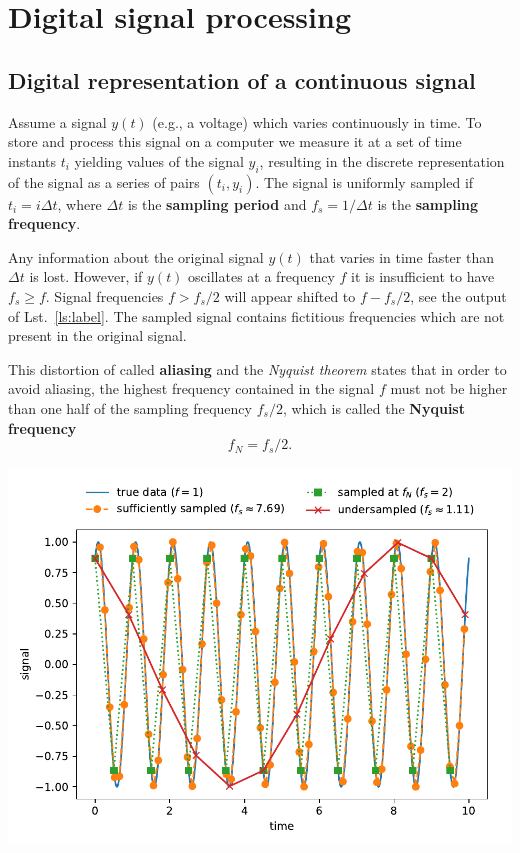 \documentclass{article}
\begin{document}
\newpage
\section{Digital signal processing}
\subsection{Digital representation of a continuous signal}
Assume a signal $y(t)$ (e.g., a voltage) which varies continuously in time. To store and process this signal on a computer we measure it at a set of time instants $t_i$ yielding values of the signal $y_i$, resulting in the discrete representation of the signal as a series of pairs $(t_i, y_i)$. The signal is uniformly sampled if $t_i = i\Delta t$, where $\Delta t$ is the \textbf{sampling period} and $f_s = 1/\Delta t$ is the \textbf{sampling frequency}.

Any information about the original signal $y(t)$ that varies in time faster than $\Delta t$ is lost. However, if $y(t)$ oscillates at a frequency $f$ it is insufficient to have $f_s \geq f$. Signal frequencies $f > f_s/2$ will appear shifted to $f - f_s/2$, see the output of Lst.~\ref{ls:label}. The sampled signal contains fictitious frequencies which are not present in the original signal. 

This distortion of called \textbf{aliasing} and the \emph{Nyquist theorem} states that in order to avoid aliasing, the highest frequency contained in the signal $f$ must not be higher than one half of the sampling frequency $f_s/2$, which is called the \textbf{Nyquist frequency} 
\begin{equation}
    \label{eq:nqyust}
    f_N = f_s/2.
\end{equation}


\begin{center}
    \includegraphics[width=0.75\linewidth]{sampling.pdf}
\end{center}
\end{document}
